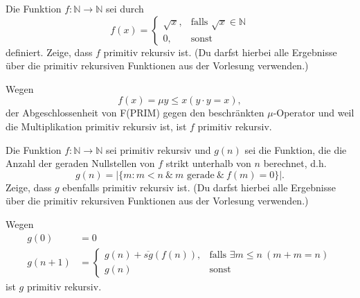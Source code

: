 \documentclass[german,headsepline]{scrartcl}
\begin{document}
	\begin{question}[subtitle={Klausur 2009}]
		Die Funktion $f:\mathbb{N}\to\mathbb{N}$ sei durch
		\[f(x)=\begin{cases}
			\sqrt{x}, &\text{falls }\sqrt{x}\in\mathbb{N} \\
			0, &\text{sonst}
		\end{cases}\]
		definiert. Zeige, dass $f$ primitiv rekursiv ist.
		(Du darfst hierbei alle Ergebnisse über die primitiv rekursiven Funktionen aus der Vorlesung verwenden.)
	\end{question}
	\begin{solution}
		Wegen
		\[f(x)=\mu y\leq x(y\cdot y=x),\]
		der Abgeschlossenheit von F(PRIM) gegen den beschränkten $\mu$-Operator
		und weil die Multiplikation primitiv rekursiv ist,
		ist $f$ primitiv rekursiv.
	\end{solution}
	
	\begin{question}[subtitle={Klausur 2009}]
		Die Funktion $f:\mathbb{N}\to\mathbb{N}$ sei primitiv rekursiv und $g(n)$ sei die Funktion,
		die die Anzahl der geraden Nullstellen von $f$ strikt unterhalb von $n$ berechnet, d.h.
		\[g(n)=\vert\{m\colon m<n~\&~m\text{ gerade}~\&~f(m)=0\}\vert.\]
		Zeige, dass $g$ ebenfalls primitiv rekursiv ist.
		(Du darfst hierbei alle Ergebnisse über die primitiv rekursiven Funktionen aus der Vorlesung verwenden.)
	\end{question}
	\begin{solution}
		Wegen
		\begin{align*}
			g(0) &= 0 \\
			g(n+1) &= \begin{cases}
				g(n)+\overline{sg}(f(n)), &\text{falls }\exists m\leq n~(m+m=n) \\
				g(n) &\text{sonst}
			\end{cases}
		\end{align*}
		ist $g$ primitiv rekursiv.
	\end{solution}
	
\end{document}
